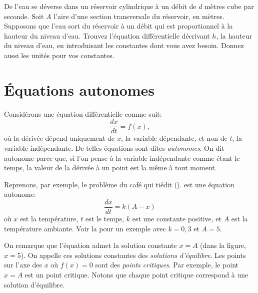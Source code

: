 \begin{exercise}
	De l'eau se déverse dans un réservoir cylindrique à un débit de $d$ mètres cube par seconde.
	Soit $A$ l'aire d'une section transversale du réservoir, en mètres.
	Supposons que l'eau sort du réservoir à un débit qui est proportionnel à la hauteur du niveau d'eau.
	Trouvez l'équation différentielle décrivant $h$, la hauteur du niveau d'eau, en introduisant les constantes dont vous avez besoin.
	Donnez aussi les unités pour vos constantes.
\end{exercise}



\sectionnewpage
\section{Équations autonomes}
\label{auteq:section}


Considérons une équation différentielle comme suit:
\begin{equation*}
	\frac{dx}{dt} = f(x),
\end{equation*}
où la dérivée dépend uniquement de $x$, la variable dépendante, et non de $t$, la variable indépendante.
De telles équations sont dites \emph{autonomes}.
On dit \og{}autonome\fg{} parce que, si l'on pense à la variable indépendante comme étant le temps, la valeur de la dérivée à un point est la même à tout moment.

Reprenons, par exemple, le problème du café qui tiédit ().
 est une équation autonome:
\begin{equation*}
	\frac{dx}{dt} = k (A-x)
\end{equation*}
où $x$ est la température, $t$ est le temps, $k$ est une constante positive,
et $A$ est la température ambiante.
 Voir la  pour un exemple avec $k=0{,}3$ et $A=5$.

On remarque que l'équation admet la solution constante $x=A$ (dans la figure, $x=5$).
On appelle ces solutions constantes des \emph{solutions d'équilibre}.
Les points sur l'axe des $x$ où $f(x) = 0$ sont des \emph{points critiques}.
Par exemple, le point  $x=A$ est un point critique. Notons que chaque point critique correspond à une solution d'équilibre.

